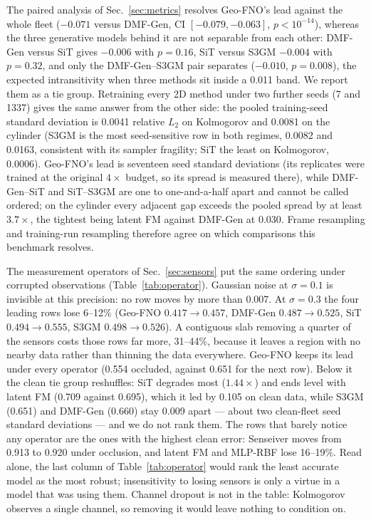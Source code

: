 \documentclass[aip,pof,reprint,amsmath,amssymb,superscriptaddress]{revtex4-1}
\newcommand{\dmfgen}{DMF-Gen}
\begin{document}
The paired analysis of Sec.~\ref{sec:metrics} resolves Geo-FNO's lead against
the whole fleet ($-0.071$ versus \dmfgen{}, CI $[-0.079,-0.063]$,
$p<10^{-14}$), whereas the three generative models behind it are not separable
from each other: \dmfgen{} versus SiT gives $-0.006$ with $p=0.16$, SiT versus
S3GM $-0.004$ with $p=0.32$, and only the \dmfgen{}--S3GM pair separates
($-0.010$, $p=0.008$), the expected intransitivity when three methods sit
inside a 0.011 band. We report them as a tie group. Retraining every 2D method
under two further seeds (7 and 1337) gives the same answer from the other
side: the pooled training-seed standard deviation is 0.0041 relative $L_2$ on
Kolmogorov and 0.0081 on the cylinder (S3GM is the most seed-sensitive row in
both regimes, 0.0082 and 0.0163, consistent with its sampler fragility; SiT
the least on Kolmogorov, 0.0006). Geo-FNO's lead is seventeen seed standard
deviations (its replicates were trained at the original $4\times$ budget, so
its spread is measured there), while \dmfgen{}--SiT and SiT--S3GM are one to
one-and-a-half apart and cannot be called ordered; on the cylinder every
adjacent gap exceeds the pooled spread by at least $3.7\times$, the tightest
being latent FM against \dmfgen{} at 0.030. Frame resampling and training-run
resampling therefore agree on which comparisons this benchmark resolves.

The measurement operators of Sec.~\ref{sec:sensors} put the same ordering
under corrupted observations (Table~\ref{tab:operator}). Gaussian noise at
$\sigma = 0.1$ is invisible at this precision: no row moves by more than
0.007. At $\sigma = 0.3$ the four leading rows lose 6--12\% (Geo-FNO
$0.417\to0.457$, \dmfgen{} $0.487\to0.525$, SiT $0.494\to0.555$, S3GM
$0.498\to0.526$). A contiguous slab removing a quarter of the sensors costs
those rows far more, 31--44\%, because it leaves a region with no nearby data
rather than thinning the data everywhere. Geo-FNO keeps its lead under every
operator (0.554 occluded, against 0.651 for the next row). Below it the clean
tie group reshuffles: SiT degrades most ($1.44\times$) and ends level with
latent FM (0.709 against 0.695), which it led by 0.105 on clean data, while
S3GM (0.651) and \dmfgen{} (0.660) stay 0.009 apart --- about two clean-fleet
seed standard deviations --- and we do not rank them. The rows that barely
notice any operator are the ones with the highest clean error: Senseiver moves
from 0.913 to 0.920 under occlusion, and latent FM and MLP-RBF lose 16--19\%.
Read alone, the last column of Table~\ref{tab:operator} would rank the least
accurate model as the most robust; insensitivity to losing sensors is only a
virtue in a model that was using them. Channel dropout is not in the table:
Kolmogorov observes a single channel, so removing it would leave nothing to
condition on.
\end{document}
